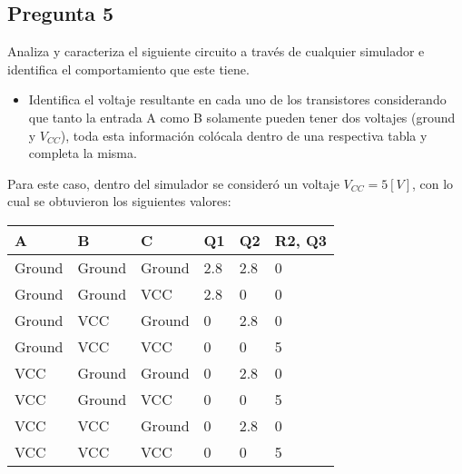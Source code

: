 \documentclass[../main.tex]{subfiles}
\begin{document}
\subsection*{Pregunta 5}
\begin{em}
  Analiza y caracteriza el siguiente circuito a través de cualquier simulador 
  e identifica el comportamiento que este tiene.
  \begin{itemize}
    \item Identifica el voltaje resultante en cada uno de los transistores 
      considerando que tanto la entrada A como B solamente pueden tener dos 
      voltajes (ground y $V_{CC}$), toda esta información colócala dentro de 
      una respectiva tabla y completa la misma.
  \end{itemize}
\end{em}

Para este caso, dentro del simulador se consideró un voltaje $V_{CC} = 5 [V]$, 
con lo cual se obtuvieron los siguientes valores:

\begin{table}[H]
  \centering
  \begin{tabular}{|p{1.5cm}|p{1.5cm}|p{1.5cm}|p{1.5cm}|p{1.5cm}|p{1.5cm}|}
    \hline
    \textbf{A}& \textbf{B}& \textbf{C}& \textbf{Q1}& \textbf{Q2}& \textbf{R2, Q3}  \\ \hline
    Ground  & Ground  & Ground  & 2.8     & 2.8     & 0       \\
    Ground  & Ground  & VCC     & 2.8     & 0       & 0       \\
    Ground  & VCC     & Ground  & 0       & 2.8     & 0       \\
    Ground  & VCC     & VCC     & 0       & 0       & 5       \\
    VCC     & Ground  & Ground  & 0       & 2.8     & 0       \\
    VCC     & Ground  & VCC     & 0       & 0       & 5       \\
    VCC     & VCC     & Ground  & 0       & 2.8     & 0       \\
    VCC     & VCC     & VCC     & 0       & 0       & 5       \\ \hline
  \end{tabular}
\end{table}
\end{document}
